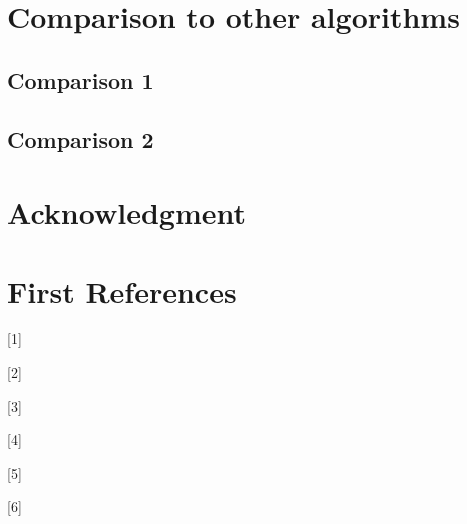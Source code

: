 \documentclass[conference]{IEEEtran}
\begin{document}
 
\section{Comparison to other algorithms}

\subsection{Comparison 1}

\subsection{Comparison 2}

\section*{Acknowledgment}

\section{First References}

[1] \cite{madhulatha2012overview}

[2] \cite{muller2016introduction}

[3] \cite{bora2014effect}

[4] \cite{mcinnes2016benchmarking}

[5] \cite{erman2006traffic}

[6] \cite{balabantaray2015document}





\end{document}
